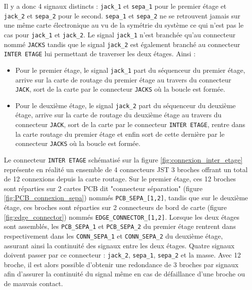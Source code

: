 \vspace{0.5cm}

Il y a donc 4 signaux distincts : \verb|jack_1| et \verb|sepa_1| pour le premier étage et \verb|jack_2| et \verb|sepa_2| pour le
second. \verb|sepa_1| et \verb|sepa_2| ne se retrouvent jamais sur une même carte électronique au vu de la symétrie du système ce
qui n'est pas le cas pour \verb|jack_1| et \verb|jack_2|. Le signal \verb|jack_1| n'est branchée qu'au connecteur nommé
\verb|JACKS| tandis que le signal \verb|jack_2| est également branché au connecteur \verb|INTER ETAGE| lui permettant de
traverser les deux étages. Ainsi :\\

\begin{itemize}
    \item Pour le premier étage, le signal \verb|jack_1| part du séquenceur du premier étage, arrive sur la carte de routage du
    premier étage au travers du connecteur \verb|JACK|, sort de la carte par le connecteur \verb|JACKS| où la boucle est
    formée.\\
    \item Pour le deuxième étage, le signal \verb|jack_2| part du séquenceur du deuxième étage, arrive sur la carte de routage du
    deuxième étage au travers du connecteur \verb|JACK|, sort de la carte par le connecteur \verb|INTER ETAGE|, rentre dans la
    carte routage du premier étage et enfin sort de cette dernière par le connecteur \verb|JACKS| où la boucle est formée.
\end{itemize}


\newpage

Le connecteur \verb|INTER ETAGE| schématisé sur la figure \ref{fig:connexion_inter_etage} représente en réalité un ensemble de
4 connecteurs JST 3 broches offrant un total de 12 connexions depuis la carte routage. Sur le premier étage, ces 12 broches sont
réparties sur 2 cartes PCB dit "connecteur séparation" (figure \ref{fig:PCB_connexion_sepa}) nommés \verb|PCB_SEPA_[1,2]|, tandis
que sur le deuxième étage, ces broches sont réparties sur 2 connecteurs de bord de carte (figure \ref{fig:edge_connector})
nommés \verb|EDGE_CONNECTOR_[1,2]|. Lorsque les deux étages sont assemblés, les \verb|PCB_SEPA_1| et \verb|PCB_SEPA_2| du
premier étage rentrent dans respectivement dans les \verb|CONN_SEPA_1| et \verb|CONN_SEPA_2| du deuxième étage, assurant ainsi la
continuité des signaux entre les deux étages. Quatre signaux doivent passer par ce connecteur : \verb|jack_2|, \verb|sepa_1|,
\verb|sepa_2| et la masse. Avec 12 broche, il est alors possible d'obtenir une redondance de 3 broches par signaux afin d'assurer
la continuité du signal même en cas de défaillance d'une broche ou de mauvais contact.

